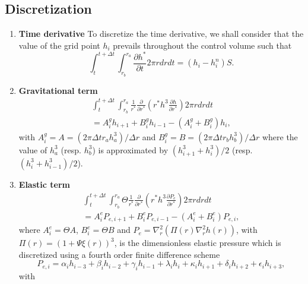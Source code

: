 \subsection{Discretization}
\label{C5-Fourth}
\begin{enumerate}
\item \textbf{Time  derivative} To discretize the  time derivative, we
  shall consider  that the  value of the  grid point  $h_{i}$ prevails
  throughout the control volume such that
  \begin{equation}
    \label{C5-num1}
    \int_{t}^{t+\Delta t} \int_{r_b}^{r_a} \frac{\partial h^{*}}{\partial t} 2\pi r dr dt=(h_{i}-h^{n}_{i})S.
  \end{equation}
\item \textbf{Gravitational term}
  \begin{eqnarray}
    \label{C5-num2}
    \int_{t}^{t+\Delta t} \int_{r_b}^{r_a} \frac{1}{r^{*}} \frac{\partial}{\partial r^{*}}\left (r^{*} h^{3} \frac{\partial h}{\partial r^{*}} \right) 2\pi r dr dt\\
    =A^{g}_{i}h_{i+1}+B^{g}_{i}h_{i-1} -(A^{g}_{i}+B^{g}_{i})h_{i} \nonumber,
  \end{eqnarray}
  with  $A^{g}_{i}= A=(2\pi  \Delta  t  r_{a}h_{a}^{3})/\Delta r$  and
  $B^{g}_{i}=B=(2\pi  \Delta  t  r_{b}h_{b}^{3})/\Delta r$  where  the
  value  of  $h_{a}^{3}$  (resp.    $h_{b}^{3}$)  is  approximated  by
  $(h_{i+1}^{3}+h_{i}^{3})/2$ (resp. $(h_{i}^{3}+h_{i-1}^{3})/2$).
\item \textbf{Elastic term}
  \begin{eqnarray}
    \label{C5-num3}
    \int_{t}^{t+\Delta t} \int_{r_b}^{r_a} \Theta \frac{1}{r^{*}} \frac{\partial}{\partial r^{*}}\left (r^{*} h^{3} \frac{\partial P_{e}}{\partial r^{*}} \right) 2\pi r dr dt \\
    =A^{e}_{i}P_{e,i+1} +B^{e}_{i}P_{e,i-1 } -(A^{e}_{i}+B^{e}_{i})P_{e,i} \nonumber,
  \end{eqnarray}
  where    $A^{e}_{i}=   \Theta    A$,   $B^{e}_{i}=\Theta    B$   and
  $P_{e}=\nabla^{2}_{r}\left( \Pi(r)\nabla^{2}_{r}h(r)  \right)$, with
  $\Pi(r)=(1+\Psi\xi(r))^3$,  is  the dimensionless  elastic  pressure
  which is discretized using a fourth order finite difference scheme
  \begin{equation}
    \label{C5-num6}
    P_{e,i}= \alpha_{i}h_{i-3} + \beta_{i}h_{i-2}+\gamma_{i} h_{i-1} +\lambda_{i}h_{i}+\kappa_{i}h_{i+1}+\delta_ih_{i+2}+\epsilon_ih_{i+3},
  \end{equation}
  with
  \begin{eqnarray}

\end{eqnarray}
\end{enumerate}
